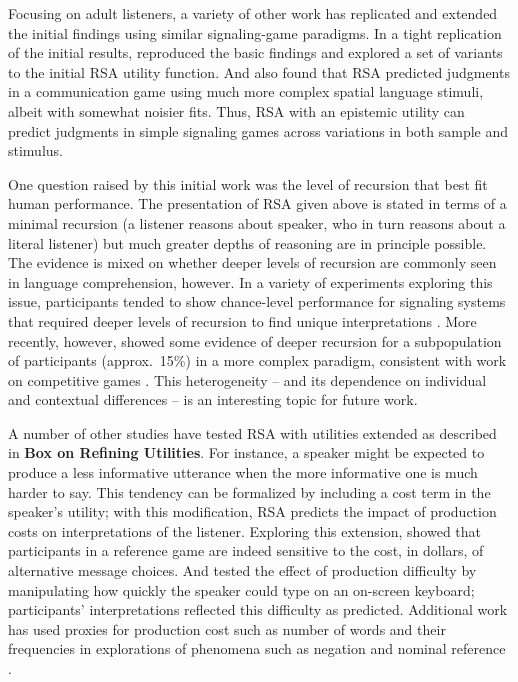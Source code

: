 \documentclass[]{elsarticle}
\begin{document}
Focusing on adult listeners, a variety of other work has replicated and extended the initial findings
using similar signaling-game paradigms. In a tight replication of the
initial results, \citet{qing2015} reproduced the basic findings and
explored a set of variants to the initial RSA utility function. 
And \citet{carstensen2014} also found that RSA
predicted judgments in a communication game using much more complex
spatial language stimuli, albeit with somewhat noisier fits. Thus, RSA
with an epistemic utility can predict judgments in simple signaling
games across variations in both sample and stimulus.

One question raised by this initial work was the level of recursion that
best fit human performance. The presentation of RSA given above is
stated in terms of a minimal recursion (a listener reasons about
speaker, who in turn reasons about a literal listener) but much greater
depths of reasoning are in principle possible. The evidence is mixed on whether deeper levels of recursion are commonly seen in language comprehension, however. In a variety of experiments exploring this issue, participants tended to show chance-level performance for signaling systems that required deeper levels of
recursion to find unique interpretations \citep{stiller2011,degen2012,vogel2013}. More recently,
however, \citet{franke2016} showed some evidence of deeper recursion
for a subpopulation of participants (approx.~15\%) in a more
complex paradigm, consistent with work on competitive
games \citep{camerer2004}. This heterogeneity -- and its dependence
on individual and contextual differences -- is an interesting topic for
future work.

A number of other studies have tested RSA with utilities extended as
described in \textbf{Box on Refining Utilities}. For instance, a speaker might be expected to
produce a less informative utterance when the more informative one is
much harder to say. This tendency can be formalized by including a cost
term in the speaker's utility; with this modification, RSA
predicts the impact of production costs on interpretations of the
listener. Exploring this extension, \citet{bergen2012} showed that participants in a reference
game are indeed sensitive to the cost, in dollars, of alternative
message choices. And \cite{degen2013} tested the effect of production
difficulty by manipulating how quickly the speaker could type on an
on-screen keyboard; participants' interpretations reflected this difficulty
as predicted. Additional work has used proxies for production cost
such as number of words and their frequencies in explorations of phenomena such as negation and nominal reference \citep{nordmeyer2014,graf2016}.
\end{document}
